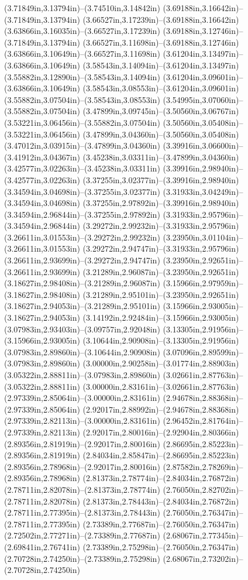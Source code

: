 (3.71849in,3.13794in)--(3.74510in,3.14842in) (3.69188in,3.16642in)--(3.71849in,3.13794in) (3.66527in,3.17239in)--(3.69188in,3.16642in) (3.63866in,3.16035in)--(3.66527in,3.17239in) (3.69188in,3.12746in)--(3.71849in,3.13794in) (3.66527in,3.11698in)--(3.69188in,3.12746in) (3.63866in,3.10649in)--(3.66527in,3.11698in) (3.61204in,3.13497in)--(3.63866in,3.10649in) (3.58543in,3.14094in)--(3.61204in,3.13497in) (3.55882in,3.12890in)--(3.58543in,3.14094in) (3.61204in,3.09601in)--(3.63866in,3.10649in) (3.58543in,3.08553in)--(3.61204in,3.09601in) (3.55882in,3.07504in)--(3.58543in,3.08553in) (3.54995in,3.07060in)--(3.55882in,3.07504in) (3.47899in,3.09745in)--(3.50560in,3.06767in) (3.53221in,3.06456in)--(3.55882in,3.07504in) (3.50560in,3.05408in)--(3.53221in,3.06456in) (3.47899in,3.04360in)--(3.50560in,3.05408in) (3.47012in,3.03915in)--(3.47899in,3.04360in) (3.39916in,3.06600in)--(3.41912in,3.04367in) (3.45238in,3.03311in)--(3.47899in,3.04360in) (3.42577in,3.02263in)--(3.45238in,3.03311in) (3.39916in,2.98940in)--(3.42577in,3.02263in) (3.37255in,3.02377in)--(3.39916in,2.98940in) (3.34594in,3.04698in)--(3.37255in,3.02377in) (3.31933in,3.04249in)--(3.34594in,3.04698in) (3.37255in,2.97892in)--(3.39916in,2.98940in) (3.34594in,2.96844in)--(3.37255in,2.97892in) (3.31933in,2.95796in)--(3.34594in,2.96844in) (3.29272in,2.99232in)--(3.31933in,2.95796in) (3.26611in,3.01553in)--(3.29272in,2.99232in) (3.23950in,3.01104in)--(3.26611in,3.01553in) (3.29272in,2.94747in)--(3.31933in,2.95796in) (3.26611in,2.93699in)--(3.29272in,2.94747in) (3.23950in,2.92651in)--(3.26611in,2.93699in) (3.21289in,2.96087in)--(3.23950in,2.92651in) (3.18627in,2.98408in)--(3.21289in,2.96087in) (3.15966in,2.97959in)--(3.18627in,2.98408in) (3.21289in,2.95101in)--(3.23950in,2.92651in) (3.18627in,2.94053in)--(3.21289in,2.95101in) (3.15966in,2.93005in)--(3.18627in,2.94053in) (3.14192in,2.92484in)--(3.15966in,2.93005in) (3.07983in,2.93403in)--(3.09757in,2.92048in) (3.13305in,2.91956in)--(3.15966in,2.93005in) (3.10644in,2.90908in)--(3.13305in,2.91956in) (3.07983in,2.89860in)--(3.10644in,2.90908in) (3.07096in,2.89599in)--(3.07983in,2.89860in) (3.00000in,2.90258in)--(3.01774in,2.88903in) (3.05322in,2.88811in)--(3.07983in,2.89860in) (3.02661in,2.87763in)--(3.05322in,2.88811in) (3.00000in,2.83161in)--(3.02661in,2.87763in) (2.97339in,2.85064in)--(3.00000in,2.83161in) (2.94678in,2.88368in)--(2.97339in,2.85064in) (2.92017in,2.88992in)--(2.94678in,2.88368in) (2.97339in,2.82113in)--(3.00000in,2.83161in) (2.96452in,2.81764in)--(2.97339in,2.82113in) (2.92017in,2.80016in)--(2.92904in,2.80366in) (2.89356in,2.81919in)--(2.92017in,2.80016in) (2.86695in,2.85223in)--(2.89356in,2.81919in) (2.84034in,2.85847in)--(2.86695in,2.85223in) (2.89356in,2.78968in)--(2.92017in,2.80016in) (2.87582in,2.78269in)--(2.89356in,2.78968in) (2.81373in,2.78774in)--(2.84034in,2.76872in) (2.78711in,2.82078in)--(2.81373in,2.78774in) (2.76050in,2.82702in)--(2.78711in,2.82078in) (2.81373in,2.78443in)--(2.84034in,2.76872in) (2.78711in,2.77395in)--(2.81373in,2.78443in) (2.76050in,2.76347in)--(2.78711in,2.77395in) (2.73389in,2.77687in)--(2.76050in,2.76347in) (2.72502in,2.77271in)--(2.73389in,2.77687in) (2.68067in,2.77345in)--(2.69841in,2.76741in) (2.73389in,2.75298in)--(2.76050in,2.76347in) (2.70728in,2.74250in)--(2.73389in,2.75298in) (2.68067in,2.73202in)--(2.70728in,2.74250in) 